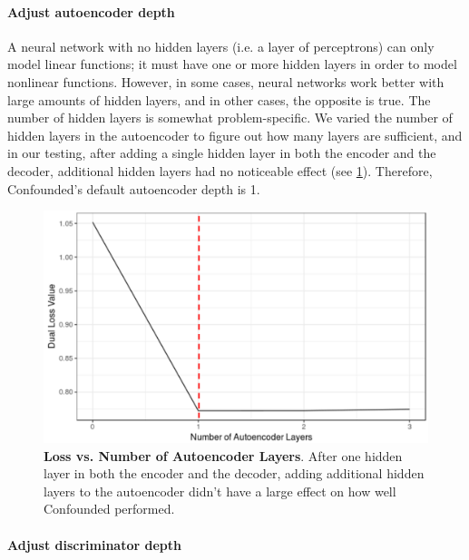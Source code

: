 \documentclass{article}
\begin{document}
\paragraph{Adjust autoencoder depth}

A neural network with no hidden layers (i.e. a layer of perceptrons) can only model linear functions;
it must have one or more hidden layers in order to model nonlinear functions.
However, in some cases, neural networks work better with large amounts of hidden layers, and in other cases, the opposite is true. %
The number of hidden layers is somewhat problem-specific.
We varied the number of hidden layers in the autoencoder to figure out how many layers are sufficient, and in our testing, after adding a single hidden layer in both the encoder and the decoder, additional hidden layers had no noticeable effect (see \figurename{} \ref{fig:ae}).
Therefore, Confounded's default autoencoder depth is 1.

\begin{figure}
	\centering
	\includegraphics[width=\columnwidth]{figures/supplement/ae_layers.png}
	\caption{\textbf{Loss vs. Number of Autoencoder Layers}.
	After one hidden layer in both the encoder and the decoder, adding additional hidden layers to the autoencoder didn't have a large effect on how well Confounded performed.
	}
	\label{fig:ae}
\end{figure}

\paragraph{Adjust discriminator depth}
\end{document}

